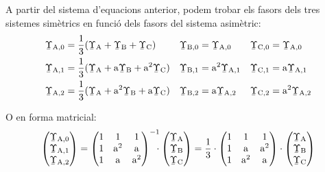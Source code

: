 A partir del sistema d'equacions anterior, podem trobar els fasors
dels tres sistemes simètrics en funció dels fasors del sistema
asimètric:
\begin{subequations}
\begin{align}
   \cmplx{\Upsilon}\ped{A,0} &= \frac{1}{3} (\cmplx{\Upsilon}\ped{A} + \cmplx{\Upsilon}\ped{B} +
   \cmplx{\Upsilon}\ped{C}) & \cmplx{\Upsilon}\ped{B,0} &= \cmplx{\Upsilon}\ped{A,0} &
   \cmplx{\Upsilon}\ped{C,0} &= \cmplx{\Upsilon}\ped{A,0}
   \label{eq:c_sim_c2}\\
   \cmplx{\Upsilon}\ped{A,1} &= \frac{1}{3} (\cmplx{\Upsilon}\ped{A} + \au \cmplx{\Upsilon}\ped{B} +
   \au^2 \cmplx{\Upsilon}\ped{C}) & \cmplx{\Upsilon}\ped{B,1} &= \au^2 \cmplx{\Upsilon}\ped{A,1} &
   \cmplx{\Upsilon}\ped{C,1} &= \au \cmplx{\Upsilon}\ped{A,1} \label{eq:c_sim_a2} \\
   \cmplx{\Upsilon}\ped{A,2} &= \frac{1}{3} (\cmplx{\Upsilon}\ped{A} + \au^2 \cmplx{\Upsilon}\ped{B} +
   \au \cmplx{\Upsilon}\ped{C}) & \cmplx{\Upsilon}\ped{B,2} &= \au \cmplx{\Upsilon}\ped{A,2} &
   \cmplx{\Upsilon}\ped{C,2} &= \au^2 \cmplx{\Upsilon}\ped{A,2} \label{eq:c_sim_b2}
\end{align}
\end{subequations}

O en forma matricial:
\begin{equation}\label{eq:c_sim_mat1}
   \begin{pmatrix}
     \cmplx{\Upsilon}\ped{A,0} \\
     \cmplx{\Upsilon}\ped{A,1} \\
     \cmplx{\Upsilon}\ped{A,2}
   \end{pmatrix} =
   \begin{pmatrix}
     1 & 1 & 1 \\
     1 & \au^2 & \au\\
     1 & \au & \au^2
   \end{pmatrix}^{-1} \hspace{-2mm}\cdot
   \begin{pmatrix}
     \cmplx{\Upsilon}\ped{A} \\
     \cmplx{\Upsilon}\ped{B} \\
     \cmplx{\Upsilon}\ped{C}
   \end{pmatrix} =  \frac{1}{3} \cdot
   \begin{pmatrix}
     1 & 1 & 1 \\
     1 & \au & \au^2 \\
     1 & \au^2 & \au
   \end{pmatrix} \cdot
   \begin{pmatrix}
     \cmplx{\Upsilon}\ped{A} \\
     \cmplx{\Upsilon}\ped{B} \\
     \cmplx{\Upsilon}\ped{C}
   \end{pmatrix}
\end{equation}

